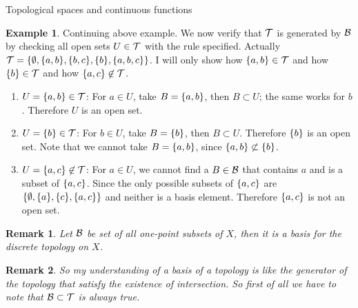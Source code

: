 \documentclass{report}
\newtheorem*{remark}{Remark}
\theoremstyle{definition}
\newtheorem{example}[theorem]{Example}
\newcommand{\set}[1]{\ensuremath\{#1\}}
\begin{document}
\begin{chapter}{Topological spaces and continuous functions}
  \begin{example}
    Continuing above example. We now verify that $\mathcal{T}$ is generated by
    $\mathcal{B}$ by checking all open sets $U\in\mathcal{T}$ with the rule specified.
    Actually \\
    ${\T=\set{\emptyset, \set{a,b}, \set{b,c}, \set{b},
        \set{a,b,c}}}$. I will only show how $\set{a,b}\in\T$ and how
    $\set{b}\in\T$ and how $\set{a,c}\not\in\T$.

    \begin{enumerate}
    \item $U=\set{a,b}\in\T$: For $a\in U$, take $B=\set{a,b}$, then
      $B\subset U$; the same works for $b$. Therefore $U$ is an open
      set.
    \item $U=\set{b}\in\T$: For $b\in U$, take $B=\set{b}$, then
      $B\subset U$. Therefore $\set{b}$ is an open set. Note that we
      cannot take $B=\set{a,b}$, since $\set{a,b}\not\subset \set{b}$.
    \item $U=\set{a,c}\not\in\T$: For $a\in U$, we cannot find a
      $B\in\mathcal{B}$ that contains $a$ and is a subset of $\set{a,c}$. Since
      the only possible subsets of $\set{a,c}$ are $\set{\emptyset,
        \set{a}, \set{c}, \set{a,c}}$ and neither is a basis
      element. Therefore $\set{a,c}$ is not an open set.
    \end{enumerate}
  \end{example}
  \begin{remark}
    Let $\mathcal{B}$ be set of all one-point subsets of $X$, then it is a
    basis for the discrete topology on $X$.
  \end{remark}
  \begin{remark}
    So my understanding of a basis of a topology is like the generator
    of the topology that satisfy the existence of intersection. So
    first of all we have to note that $\mathcal{B}\subset\mathcal{T}$ is always true.
  \end{remark}
\end{chapter}

\printindex
\end{document}
